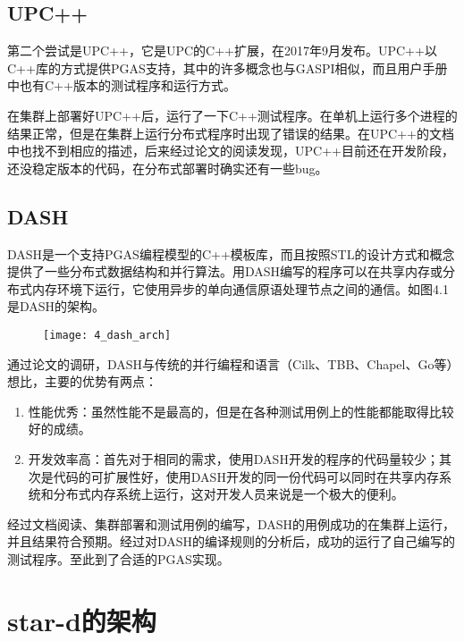 \subsection{UPC++}

第二个尝试是UPC++，它是UPC的C++扩展，在2017年9月发布。UPC++以C++库的方式提供PGAS支持，其中的许多概念也与GASPI相似，而且用户手册中也有C++版本的测试程序和运行方式。

在集群上部署好UPC++后，运行了一下C++测试程序。在单机上运行多个进程的结果正常，但是在集群上运行分布式程序时出现了错误的结果。在UPC++的文档中也找不到相应的描述，后来经过论文\citep{furlinger2016dash}的阅读发现，UPC++目前还在开发阶段，还没稳定版本的代码，在分布式部署时确实还有一些bug。

\subsection{DASH}

DASH是一个支持PGAS编程模型的C++模板库，而且按照STL的设计方式和概念提供了一些分布式数据结构和并行算法。用DASH编写的程序可以在共享内存或分布式内存环境下运行，它使用异步的单向通信原语处理节点之间的通信。如图4.1是DASH的架构。

\begin{figure}[!htbp]
    \centering
    \texttt{[image: 4\_dash\_arch]}
    \label{fig:4_dash_arch}
\end{figure}
 
通过论文\citep{furlinger2018investigating}的调研，DASH与传统的并行编程和语言（Cilk、TBB、Chapel、Go等）想比，主要的优势有两点：

\begin{enumerate}
	\item 性能优秀：虽然性能不是最高的，但是在各种测试用例上的性能都能取得比较好的成绩。
	\item 开发效率高：首先对于相同的需求，使用DASH开发的程序的代码量较少；其次是代码的可扩展性好，使用DASH开发的同一份代码可以同时在共享内存系统和分布式内存系统上运行，这对开发人员来说是一个极大的便利。
\end{enumerate}

经过文档阅读、集群部署和测试用例的编写，DASH的用例成功的在集群上运行，并且结果符合预期。经过对DASH的编译规则的分析后，成功的运行了自己编写的测试程序。至此到了合适的PGAS实现。

\section{star-d的架构}

